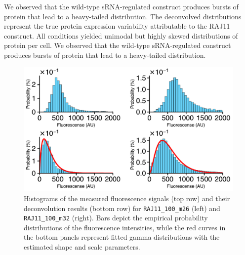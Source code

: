 We observed that the wild-type sRNA-regulated construct produces bursts of protein that lead to a heavy-tailed distribution. The deconvolved distributions represent the true protein expression variability attributable to the RAJ11 construct. All conditions yielded unimodal but highly skewed distributions of protein per cell. We observed that the wild-type sRNA-regulated construct produces bursts of protein that lead to a heavy-tailed distribution. %



\begin{figure}[ht!]
    \centering
    \includegraphics[width=0.67\linewidth]{assets/addendumFig2.pdf}
    \caption{Histograms of the measured fluorescence signals (top row) and their deconvolution results (bottom row) for \texttt{RAJ11\_100\_m26} (left) and \texttt{RAJ11\_100\_m32} (right). Bars depict the empirical probability distributions of the fluorescence intensities, while the red curves in the bottom panels represent fitted gamma distributions with the estimated shape and scale parameters.}\label{fig:figadd.2}
\end{figure}


